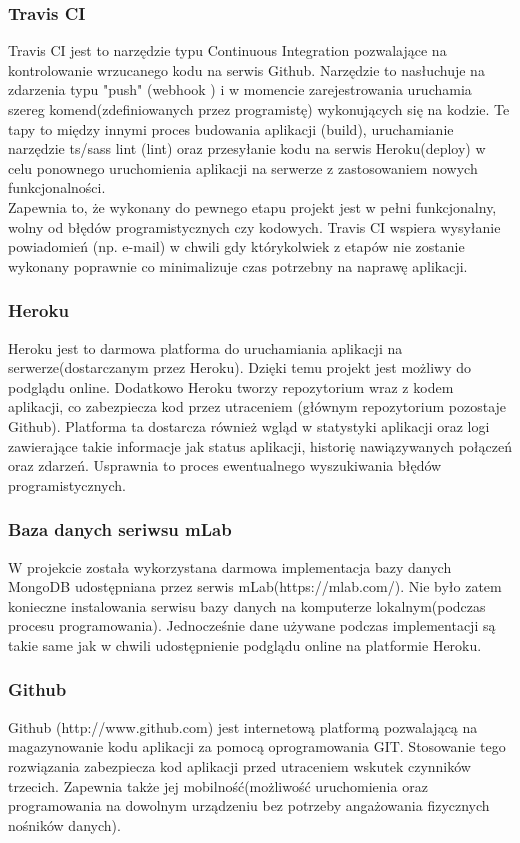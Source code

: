 \documentclass[eng,printmode]{mgr}
\begin{document}
\subsubsection{Travis CI}
Travis CI \cite{TravisCI} jest to narzędzie typu Continuous Integration \cite{Keyword_CI} pozwalające na kontrolowanie wrzucanego kodu na serwis Github. Narzędzie to nasłuchuje na zdarzenia typu "push" (webhook \cite{Keyword_Webhook}) i w momencie zarejestrowania uruchamia szereg komend(zdefiniowanych przez programistę) wykonujących się na kodzie. Te tapy to między innymi proces budowania aplikacji (build), uruchamianie narzędzie ts/sass lint (lint) oraz przesyłanie kodu na serwis Heroku(deploy) w celu ponownego uruchomienia aplikacji na serwerze z zastosowaniem nowych funkcjonalności. \\
Zapewnia to, że wykonany do pewnego etapu projekt jest w pełni funkcjonalny, wolny od błędów programistycznych czy kodowych. Travis CI wspiera wysyłanie powiadomień (np. e-mail) w chwili gdy którykolwiek z etapów nie zostanie wykonany poprawnie co minimalizuje czas potrzebny na naprawę aplikacji.

\subsubsection{Heroku}
Heroku \cite{Heroku} jest to darmowa platforma do uruchamiania aplikacji na serwerze(dostarczanym przez Heroku). Dzięki temu projekt jest możliwy do podglądu online. Dodatkowo Heroku tworzy repozytorium wraz z kodem aplikacji, co zabezpiecza kod przez utraceniem (głównym repozytorium pozostaje Github). Platforma ta dostarcza również wgląd w statystyki aplikacji oraz logi zawierające takie informacje jak status aplikacji, historię nawiązywanych połączeń oraz zdarzeń. Usprawnia to proces ewentualnego wyszukiwania błędów programistycznych.

\subsubsection{Baza danych seriwsu mLab}
W projekcie została wykorzystana darmowa implementacja bazy danych MongoDB udostępniana przez serwis mLab(https://mlab.com/). Nie było zatem konieczne instalowania serwisu bazy danych na komputerze lokalnym(podczas procesu programowania). Jednocześnie dane używane podczas implementacji są takie same jak w chwili udostępnienie podglądu online na platformie Heroku.

\subsubsection{Github}
Github (http://www.github.com) jest internetową platformą pozwalającą na magazynowanie kodu aplikacji za pomocą oprogramowania GIT. Stosowanie tego rozwiązania zabezpiecza kod aplikacji przed utraceniem wskutek czynników trzecich. Zapewnia także jej mobilność(możliwość uruchomienia oraz programowania na dowolnym urządzeniu bez potrzeby angażowania fizycznych nośników danych).
\\
\\
\end{document}
